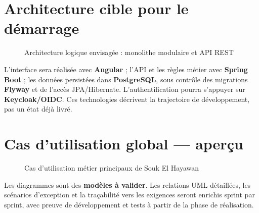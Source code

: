 \section{Architecture cible pour le démarrage}
\begin{figure}[htbp]\centering

\caption{Architecture logique envisagée : monolithe modulaire et API REST}
\label{fig:architecture}
\end{figure}
L’interface sera réalisée avec \textbf{Angular} ; l’API et les règles métier avec \textbf{Spring Boot} ; les données persistées dans \textbf{PostgreSQL}, sous contrôle des migrations \textbf{Flyway} et de l’accès JPA/Hibernate. L’authentification pourra s’appuyer sur \textbf{Keycloak/OIDC}. Ces technologies décrivent la trajectoire de développement, pas un état déjà livré.

\section{Cas d’utilisation global --- aperçu}
\begin{figure}[htbp]\centering

\caption{Cas d’utilisation métier principaux de Souk El Hayawan}
\label{fig:uc-global}
\end{figure}
\begin{warningbox}
Les diagrammes sont des \textbf{modèles à valider}. Les relations UML détaillées, les scénarios d’exception et la traçabilité vers les exigences seront enrichis sprint par sprint, avec preuve de développement et tests à partir de la phase de réalisation.
\end{warningbox}
